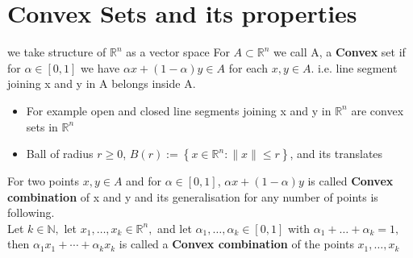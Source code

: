 \documentclass[oneside]{book}
\begin{document}








































\section{Convex Sets and its properties } 
we take structure of  $\mathbb{R}^n$ as a vector space 
For $ A \subset \mathbb{R}^n$ we call A, a \textbf{Convex} set  if for $\alpha \in [0,1]$ we have $\alpha x +(1- \alpha)y \in A $ for each  $x, y \in A.$  i.e. line segment joining x and y in A belongs inside A.\\
\begin{itemize}
    \item  For example open and closed line segments joining x and y in $\mathbb{R}^n$ are convex sets in $\mathbb{R}^n$

\item  

 Ball of radius $r \geq 0$,  $B (r):=\left\{x \in \mathbb{R}^{n}:\|x\| \leq r\right\}$,  and its translates
 
 \end{itemize}

 For two points $x,y \in A$ and for $\alpha \in [0,1]$, $\alpha x +(1- \alpha)y  $ is called \textbf{Convex combination} of x and y and its generalisation for any number of  points is following. \\

Let $k \in \mathbb{N},$ let $x_{1}, \ldots, x_{k} \in \mathbb{R}^{n},$ and let $\alpha_{1}, \ldots, \alpha_{k} \in[0,1]$ with $\alpha_{1}+\ldots+\alpha_{k}=1,$ then
$\alpha_{1} x_{1}+\cdots+\alpha_{k} x_{k}$ is called a \textbf{Convex combination} of the points $x_{1}, \ldots, x_{k}$
\end{document}

